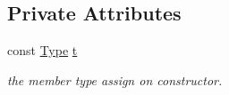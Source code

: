 \subsection*{Private Attributes}
\begin{DoxyCompactItemize}
\item 
\hypertarget{classdocs_1_1DocType_a58ced824f3508e8f8d73b1ff1bfefc0a}{const \hyperlink{namespacedocs_a150efca62822b8ab62a5afabe299bf75}{Type} \hyperlink{classdocs_1_1DocType_a58ced824f3508e8f8d73b1ff1bfefc0a}{t}}\label{classdocs_1_1DocType_a58ced824f3508e8f8d73b1ff1bfefc0a}

\begin{DoxyCompactList}\small\item\em the member type assign on constructor. \end{DoxyCompactList}\end{DoxyCompactItemize}
